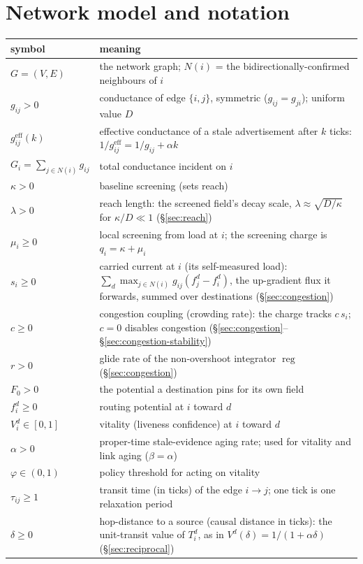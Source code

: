 \documentclass[11pt]{article}
\theoremstyle{plain}
\numberwithin{equation}{section}
\begin{document}
\section{Network model and notation}\label{sec:notation}

\begin{center}
\small
\begin{tabularx}{\textwidth}{>{\raggedright\arraybackslash}p{}X}
\hline
\textbf{symbol} & \textbf{meaning} \\
\hline
$G=(V,E)$ & the network graph; $N(i)$ = the bidirectionally-confirmed neighbours of $i$ \\
$g_{ij}>0$ & conductance of edge $\{i,j\}$, symmetric ($g_{ij}=g_{ji}$); uniform value $D$ \\
$g^{\mathrm{eff}}_{ij}(k)$ & effective conductance of a stale advertisement after $k$ ticks: $1/g^{\mathrm{eff}}_{ij}=1/g_{ij}+\alpha k$ \\
$G_i=\sum_{j\in N(i)}g_{ij}$ & total conductance incident on $i$ \\
$\kappa>0$ & baseline screening (sets reach) \\
$\lambda>0$ & reach length: the screened field's decay scale, $\lambda\approx\sqrt{D/\kappa}$ for $\kappa/D\ll1$ (§\ref{sec:reach}) \\
$\mu_i\ge 0$ & local screening from load at $i$; the screening charge is $q_i=\kappa+\mu_i$ \\
$s_i\ge 0$ & carried current at $i$ (its self-measured load): $\sum_{d}\max_{j\in N(i)}g_{ij}(f^d_j-f^d_i)$, the up-gradient flux it forwards, summed over destinations (§\ref{sec:congestion}) \\
$c\ge 0$ & congestion coupling (crowding rate): the charge tracks $c\,s_i$; $c=0$ disables congestion (§\ref{sec:congestion}–§\ref{sec:congestion-stability}) \\
$r>0$ & glide rate of the non-overshoot integrator $\operatorname{reg}$ (§\ref{sec:congestion}) \\
$F_0>0$ & the potential a destination pins for its own field \\
$f^d_i\ge 0$ & routing potential at $i$ toward $d$ \\
$V^d_i\in[0,1]$ & vitality (liveness confidence) at $i$ toward $d$ \\
$\alpha>0$ & proper-time stale-evidence aging rate; used for vitality and link aging ($\beta=\alpha$) \\
$\varphi\in(0,1)$ & policy threshold for acting on vitality \\
$\tau_{ij}\ge 1$ & transit time (in ticks) of the edge $i\!\to\!j$; one tick is one relaxation period \\
$\delta\ge 0$ & hop-distance to a source (causal distance in ticks): the unit-transit value of $T^d_i$, as in $V^d(\delta)=1/(1+\alpha\delta)$ (§\ref{sec:reciprocal}) \\
\hline
\end{tabularx}
\end{center}
\end{document}
